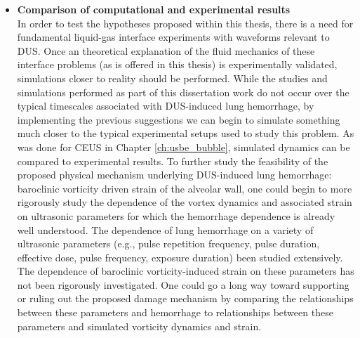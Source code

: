 \begin{itemize}
\item \textbf{Comparison of computational and experimental results}\\
  In order to test the hypotheses proposed within this thesis, there
  is a need for fundamental liquid-gas interface experiments with
  waveforms relevant to \ac{DUS}. Once an theoretical explanation of
  the fluid mechanics of these interface problems (as is offered in
  this thesis) is experimentally validated, simulations closer to
  reality should be performed. While the studies and simulations
  performed as part of this dissertation work do not occur over the
  typical timescales associated with \ac{DUS}-induced lung hemorrhage,
  by implementing the previous suggestions we can begin to simulate
  something much closer to the typical experimental setups used to
  study this problem. As was done for \ac{CEUS} in Chapter
  \ref{ch:usbe_bubble}, simulated dynamics can be compared to
  experimental results. To further study the feasibility of the
  proposed physical mechanism underlying \ac{DUS}-induced lung
  hemorrhage: baroclinic vorticity driven strain of the alveolar wall,
  one could begin to more rigorously study the dependence of the
  vortex dynamics and associated strain on ultrasonic parameters for
  which the hemorrhage dependence is already well understood. The
  dependence of lung hemorrhage on a variety of ultrasonic parameters
  (e.g., pulse repetition frequency, pulse duration, effective dose,
  pulse frequency, exposure duration) been studied extensively. The
  dependence of baroclinic vorticity-induced strain on these
  parameters has not been rigorously investigated. One could go a long
  way toward supporting or ruling out the proposed damage mechanism by
  comparing the relationships between these parameters and hemorrhage
  to relationships between these parameters and simulated vorticity
  dynamics and strain.
\end{itemize}



